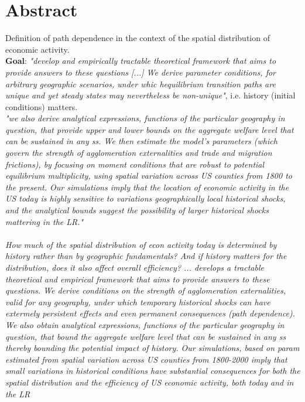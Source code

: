 \documentclass[12pt, final]{article}
\begin{document}
\iffalse








\newpage

\section{Abstract} %
\label{sec:abstract}

Definition of path dependence in the context of the spatial distribution of economic activity. \\
\textbf{Goal}: \textit{"develop and empirically tractable theoretical framework that aims to provide answers to these questions [...] We derive parameter conditions, for arbitrary geographic scenarios, under whic hequilibrium transition paths are unique and yet steady states may nevertheless be non-unique"}, i.e. history (initial conditions) matters.
\\
\textit{"we also derive analytical expressions, functions of the particular geography in question, that provide upper and lower bounds on the aggregate welfare level that can be sustained in any ss. We then estimate the model's parameters (which govern the strength of agglomeration externalities and trade and migration frictions), by focusing on moment conditions that are robust to potential equilibrium multiplicity, using spatial variation across US counties from 1800 to the present. Our simulations imply that the location of economic activity in the US today is highly sensitive to variations geographically local historical shocks, and the analytical bounds suggest the possibility of larger historical shocks mattering in the LR."}
\\
\\
\textit{How much of the spatial distribution of econ activity today is determined by history rather than by geographic fundamentals? And if history matters for the distribution, does it also affect overall efficiency? ... develops a tractable theoretical and empirical framework that aims to provide answers to these questions. We derive conditions on the strength of agglomeration externalities, valid for any geography, under which temporary historical shocks can have extermely persistent effects and even permanent consequences (path dependence). We also obtain analytical expressions, functions of the particular geography in question, that bound the aggregate welfare level that can be sustained in any ss thereby bounding the potential impact of history. Our simulations, based on param estimated from spatial variation across US counties from 1800-2000 imply that small variations in historical conditions have substantial consequences for both the spatial distribution and the efficiency of US economic activity, both today and in the LR}
\end{document}
